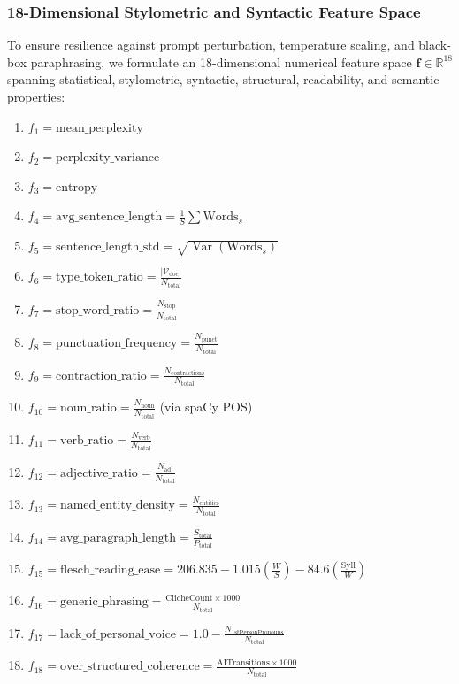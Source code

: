 \documentclass[journal]{IEEEtran}
\begin{document}
\subsubsection{18-Dimensional Stylometric and Syntactic Feature Space}
To ensure resilience against prompt perturbation, temperature scaling, and black-box paraphrasing, we formulate an 18-dimensional numerical feature space $\mathbf{f} \in \mathbb{R}^{18}$ spanning statistical, stylometric, syntactic, structural, readability, and semantic properties:
\begin{enumerate}
    \item $f_1 = \text{mean\_perplexity}$
    \item $f_2 = \text{perplexity\_variance}$
    \item $f_3 = \text{entropy}$
    \item $f_4 = \text{avg\_sentence\_length} = \frac{1}{S}\sum \text{Words}_s$
    \item $f_5 = \text{sentence\_length\_std} = \sqrt{\operatorname{Var}(\text{Words}_s)}$
    \item $f_6 = \text{type\_token\_ratio} = \frac{|\mathcal{V}_{\text{doc}}|}{N_{\text{total}}}$
    \item $f_7 = \text{stop\_word\_ratio} = \frac{N_{\text{stop}}}{N_{\text{total}}}$
    \item $f_8 = \text{punctuation\_frequency} = \frac{N_{\text{punct}}}{N_{\text{total}}}$
    \item $f_9 = \text{contraction\_ratio} = \frac{N_{\text{contractions}}}{N_{\text{total}}}$
    \item $f_{10} = \text{noun\_ratio} = \frac{N_{\text{noun}}}{N_{\text{total}}}$ (via spaCy POS)
    \item $f_{11} = \text{verb\_ratio} = \frac{N_{\text{verb}}}{N_{\text{total}}}$
    \item $f_{12} = \text{adjective\_ratio} = \frac{N_{\text{adj}}}{N_{\text{total}}}$
    \item $f_{13} = \text{named\_entity\_density} = \frac{N_{\text{entities}}}{N_{\text{total}}}$
    \item $f_{14} = \text{avg\_paragraph\_length} = \frac{S_{\text{total}}}{P_{\text{total}}}$
    \item $f_{15} = \text{flesch\_reading\_ease} = 206.835 - 1.015\left(\frac{W}{S}\right) - 84.6\left(\frac{\text{Syll}}{W}\right)$~\cite{kincaid1975derivation}
    \item $f_{16} = \text{generic\_phrasing} = \frac{\text{ClicheCount} \times 1000}{N_{\text{total}}}$
    \item $f_{17} = \text{lack\_of\_personal\_voice} = 1.0 - \frac{N_{\text{1stPersonPronouns}}}{N_{\text{total}}}$
    \item $f_{18} = \text{over\_structured\_coherence} = \frac{\text{AITransitions} \times 1000}{N_{\text{total}}}$
\end{enumerate}
\end{document}
